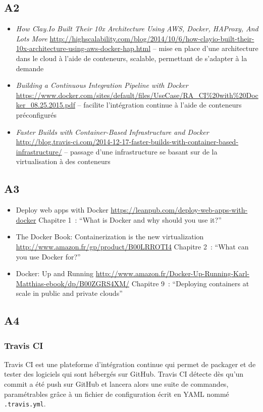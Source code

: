 \subsection*{A2}
    \begin{itemize}
        \item \textit{How Clay.Io Built Their 10x Architecture Using AWS, Docker, HAProxy, And Lots More} \url{http://highscalability.com/blog/2014/10/6/how-clayio-built-their-10x-architecture-using-aws-docker-hap.html} -- mise en place d'une architecture dans le cloud à l'aide de conteneurs, scalable, permettant de s'adapter à la demande
        \item \textit{Building a Continuous Integration Pipeline with Docker} \url{https://www.docker.com/sites/default/files/UseCase/RA_CI%20with%20Docker_08.25.2015.pdf} -- facilite l'intégration continue à l'aide de conteneurs préconfigurés
        \item \textit{Faster Builds with Container-Based Infrastructure and Docker} \url{http://blog.travis-ci.com/2014-12-17-faster-builds-with-container-based-infrastructure/} -- passage d'une infrastructure se basant sur de la virtualisation à des conteneurs
    \end{itemize}

\subsection*{A3}
    \begin{itemize}
        \item Deploy web apps with Docker \url{https://leanpub.com/deploy-web-apps-with-docker} Chapitre 1 : \enquote{What is Docker and why should you use it?}
        \item The Docker Book: Containerization is the new virtualization \url{http://www.amazon.fr/gp/product/B00LRROTI4} Chapitre 2 : \enquote{What can you use Docker for?}
        \item Docker: Up and Running \url{http://www.amazon.fr/Docker-Up-Running-Karl-Matthias-ebook/dp/B00ZGRS4XM/} Chapitre 9 : \enquote{Deploying containers at scale in public and private clouds}
    \end{itemize}

\subsection*{A4}
    \subsubsection*{Travis CI}
    Travis CI est une plateforme d'intégration continue qui permet de packager et de tester des logiciels qui sont hébergés sur GitHub. Travis CI détecte dès qu'un commit a été push sur GitHub et lancera alors une suite de commandes, paramétrables grâce à un fichier de configuration écrit en YAML nommé \texttt{.travis.yml}.\\

